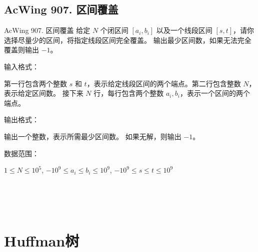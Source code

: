 \subsection{AcWing 907. 区间覆盖}
\begin{titledbox}{AcWing 907. 区间覆盖}
    给定 $N$ 个闭区间 $[a_i,b_i]$ 以及一个线段区间 $[s,t]$，请你选择尽量少的区间，将指定线段区间完全覆盖。 输出最少区间数，如果无法完全覆盖则输出 $-1$。

    输入格式：

    第一行包含两个整数 $s$ 和 $t$，表示给定线段区间的两个端点。第二行包含整数 $N$，表示给定区间数。 接下来 $N$ 行，每行包含两个整数 $a_i,b_i$，表示一个区间的两个端点。

    输出格式：

    输出一个整数，表示所需最少区间数。 如果无解，则输出 $-1$。

    数据范围：

    $1 \le N \le 10^5$, $-10^9 \le a_i \le b_i \le 10^9$, $-10^9 \le s \le t \le 10^9$

    \begin{inputblock}
         \\
         \\
         \\
    \end{inputblock}
    \begin{outputblock}
    \end{outputblock}
\end{titledbox}


\section{Huffman树}

